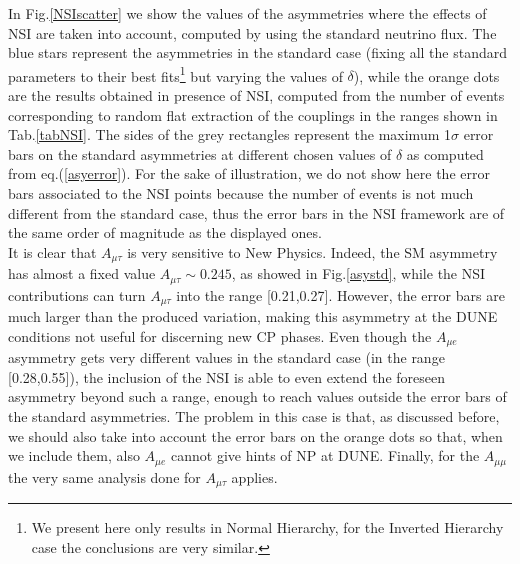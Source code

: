 \documentclass[12pt]{article}
\begin{document}
In Fig.\ref{NSIscatter} we show the values of the asymmetries where the effects of NSI are taken into account, computed by using the standard neutrino flux. The blue stars represent the asymmetries in the standard case  (fixing all the standard parameters to their best fits\footnote{We present here only results in Normal Hierarchy, for the Inverted Hierarchy case the conclusions are very similar.} but varying the values of $\delta$), while the orange dots are the results obtained in presence of NSI, computed from the number of events corresponding to random flat extraction of the couplings in the ranges shown in Tab.\ref{tabNSI}. The sides of the grey rectangles represent the maximum 1$\sigma$ error bars on the standard asymmetries at different chosen values of $\delta$ as computed from eq.(\ref{asyerror}). For the sake of illustration, we do not show here the error bars associated to the NSI points because the number of events is not much different from the standard case, thus the error bars in the NSI framework are of the same order of magnitude as the displayed ones. \\
It is clear that $A_{\mu\tau}$ is very sensitive to New Physics. Indeed, the SM asymmetry has almost a fixed value $A_{\mu\tau}\sim 0.245$, as showed in Fig.\ref{asystd}, while the NSI contributions can turn $A_{\mu\tau}$ into the range [0.21,0.27]. However, the error bars are much larger than the produced variation, making this asymmetry at the DUNE conditions not useful for discerning new CP phases. Even though the $A_{\mu e}$ asymmetry  gets very different values in the standard case (in the range [0.28,0.55]),  the inclusion of the NSI is able to even extend the foreseen asymmetry beyond such a range, enough to reach values outside the error bars of the standard asymmetries. The problem in this case is that, as discussed before, we should also take into account the error bars on the orange dots so that, when we include them, also $A_{\mu e}$ cannot give hints of NP at DUNE. 
Finally, for the $A_{\mu\mu}$ the very same analysis done for $A_{\mu\tau}$ applies. 
\end{document}
